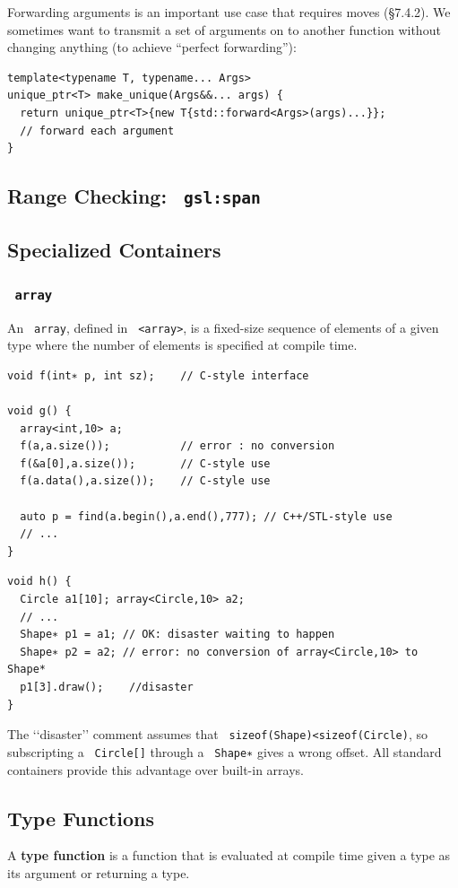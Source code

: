 \documentclass[11pt]{article}
\let\OldTexttt\texttt
\renewcommand{\texttt}[1]{\OldTexttt{\color{MidnightBlue} #1}}
\begin{document}
Forwarding arguments is an important use case that requires moves (§7.4.2). We sometimes want to
transmit a set of arguments on to another function without changing anything (to achieve
``perfect forwarding''):
\begin{verbatim}
template<typename T, typename... Args>
unique_ptr<T> make_unique(Args&&... args) {
  return unique_ptr<T>{new T{std::forward<Args>(args)...}};
  // forward each argument
}
\end{verbatim}
\subsection{Range Checking: \texttt{gsl:span}}
\label{sec:org639b306}
\subsection{Specialized Containers}
\label{sec:org32bfc5b}
\subsubsection{\texttt{array}}
\label{sec:org7b0ec6d}
An \texttt{array}, defined in \texttt{<array>}, is a fixed-size sequence of elements of a given type where the
number of elements is specified at compile time.

\begin{verbatim}
void f(int∗ p, int sz);    // C-style interface

void g() {
  array<int,10> a;
  f(a,a.size());           // error : no conversion
  f(&a[0],a.size());       // C-style use  
  f(a.data(),a.size());    // C-style use

  auto p = find(a.begin(),a.end(),777); // C++/STL-style use
  // ...
}
\end{verbatim}

\begin{verbatim}
void h() {
  Circle a1[10]; array<Circle,10> a2;
  // ...
  Shape∗ p1 = a1; // OK: disaster waiting to happen
  Shape∗ p2 = a2; // error: no conversion of array<Circle,10> to Shape*
  p1[3].draw();    //disaster
}
\end{verbatim}

The ‘‘disaster’’ comment assumes that \texttt{sizeof(Shape)<sizeof(Circle)}, so subscripting a \texttt{Circle[]} through
a \texttt{Shape∗} gives a wrong offset. All standard containers provide this advantage over built-in
arrays.
\subsection{Type Functions}
\label{sec:org857126b}
A \textbf{type function} is a function that is evaluated at compile time given a type as its argument or
returning a type.
\end{document}
